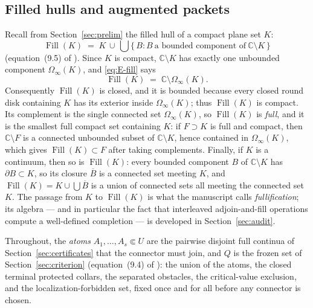 \documentclass[11pt,reqno]{amsart}
\theoremstyle{definition}
\theoremstyle{remark}
\newcommand{\C}{\mathbb C}
\newcommand{\Fill}{\operatorname{Fill}}
\begin{document}
\subsection{Filled hulls and augmented packets}\label{subsec:E-packet-def}

Recall from Section~\ref{sec:prelim} the filled hull of a compact plane set $K$:
\begin{equation}\label{eq:E-fill}
\Fill(K)\;=\;K\,\cup\,\bigcup\bigl\{\,B : B\ \text{a bounded component of}\
\C\setminus K\,\bigr\}
\end{equation}
(equation~(9.5) of \cite{MWman}). Since $K$ is compact, $\C\setminus K$ has exactly
one unbounded component $\Omega_\infty(K)$, and \eqref{eq:E-fill} says
\[
\Fill(K)\;=\;\C\setminus\Omega_\infty(K).
\]
Consequently $\Fill(K)$ is closed, and it is bounded because every closed round disk
containing $K$ has its exterior inside $\Omega_\infty(K)$; thus $\Fill(K)$ is compact.
Its complement is the single connected set $\Omega_\infty(K)$, so $\Fill(K)$ is
\emph{full}, and it is the smallest full compact set containing $K$: if $F\supset K$
is full and compact, then $\C\setminus F$ is a connected unbounded subset of
$\C\setminus K$, hence contained in $\Omega_\infty(K)$, which gives
$\Fill(K)\subset F$ after taking complements. Finally, if $K$ is a continuum, then so
is $\Fill(K)$: every bounded component $B$ of $\C\setminus K$ has
$\partial B\subset K$, so its closure $\overline B$ is a connected set meeting $K$,
and $\Fill(K)=K\cup\bigcup\overline B$ is a union of connected sets all meeting the
connected set $K$. The passage from $K$ to $\Fill(K)$ is what the manuscript calls
\emph{fullification}; its algebra --- and in particular the fact that interleaved
adjoin-and-fill operations compute a well-defined completion --- is developed in
Section~\ref{sec:audit}.

Throughout, the \emph{atoms} $A_1,\dots,A_s\Subset U$ are the pairwise disjoint full
continua of Section~\ref{sec:certificates} that the connector must join, and $Q$ is
the frozen set of Section~\ref{sec:criterion} (equation~(9.4) of \cite{MWman}): the
union of the atoms, the closed terminal protected collars, the separated obstacles,
the critical-value exclusion, and the localization-forbidden set, fixed once and for
all before any connector is chosen.
\end{document}
